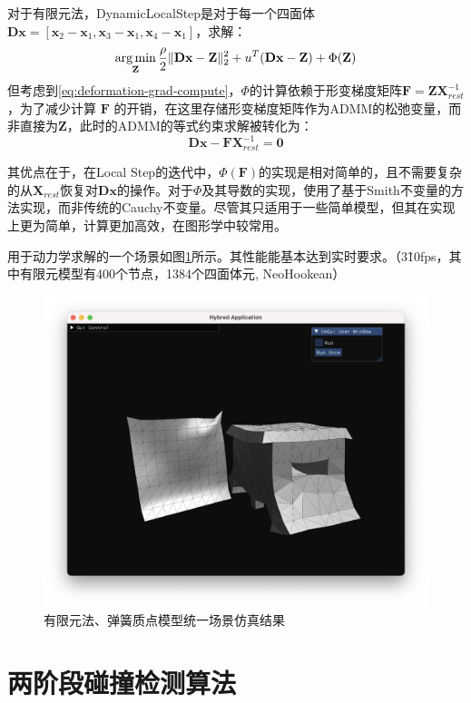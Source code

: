 对于有限元法，DynamicLocalStep是对于每一个四面体$\mathbf D \mathbf x = [\mathbf x_2 - \mathbf x_{1},\mathbf x_3 - \mathbf x_{1}, \mathbf x_4 - \mathbf x_1]$，求解：
\begin{equation}
  \mathop{\arg\min}\limits_{\mathbf Z} \frac{\rho}{2}\| \mathbf{Dx} - \mathbf{Z} \|_2^2 + u^{T} (\mathbf{Dx} - \mathbf{Z}) + \Phi(\mathbf Z)
\end{equation}
但考虑到\ref{eq:deformation-grad-compute}，$\Phi$的计算依赖于形变梯度矩阵$\mathbf F = \mathbf Z\mathbf X_{rest}^{-1}$，为了减少计算 $\mathbf F$ 的开销，在这里存储形变梯度矩阵作为ADMM的松弛变量，而非直接为$\mathbf Z$，此时的ADMM的等式约束求解被转化为：
\begin{equation}
  \mathbf{Dx} - \mathbf{FX}_{rest}^{-1} = \mathbf 0
\end{equation}

其优点在于，在Local Step的迭代中，$\Phi(\mathbf F)$的实现是相对简单的，且不需要复杂的从$\mathbf X_{rest}$恢复对$\mathbf {Dx}$的操作。对于$\Phi$及其导数的实现，使用了基于Smith不变量的方法实现，而非传统的Cauchy不变量。尽管其只适用于一些简单模型，但其在实现上更为简单，计算更加高效，在图形学中较常用。

用于动力学求解的一个场景如图\ref{fig:hybrid-admm-result}所示。其性能能基本达到实时要求。（3\~10fps，其中有限元模型有400个节点，1384个四面体元, NeoHookean）

\begin{figure}[hbt]
  \centering
  \includegraphics[width=0.75\linewidth]{img/hybrid-admm.png}
  \caption{有限元法、弹簧质点模型统一场景仿真结果}\label{fig:hybrid-admm-result}
\end{figure}


\section{两阶段碰撞检测算法}\label{sec:collid-detect}

